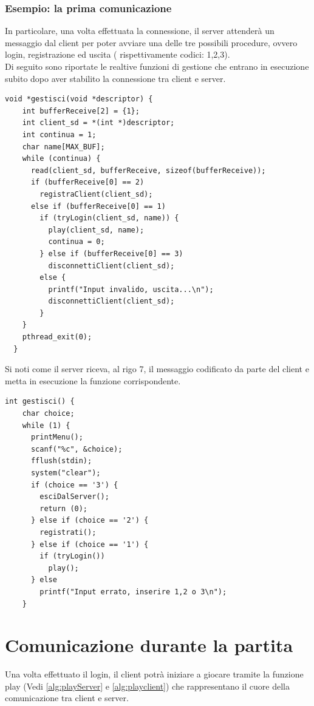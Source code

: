 \documentclass[a4paper]{article}
\begin{document}
 \subsubsection{Esempio: la prima comunicazione}
 In particolare, una volta effettuata la connessione,
il server attenderà un messaggio dal client per poter avviare una delle tre possibili procedure, ovvero login, registrazione ed uscita ( rispettivamente codici: 1,2,3).\\
Di seguito sono riportate le realtive funzioni di gestione che entrano in esecuzione subito dopo aver stabilito la connessione
tra client e server.
\begin{lstlisting}[caption=Prima comunicazione del server, label=alg:serverPreLogin]
  void *gestisci(void *descriptor) {
    int bufferReceive[2] = {1};
    int client_sd = *(int *)descriptor;
    int continua = 1;
    char name[MAX_BUF];
    while (continua) {
      read(client_sd, bufferReceive, sizeof(bufferReceive));
      if (bufferReceive[0] == 2)
        registraClient(client_sd);
      else if (bufferReceive[0] == 1)
        if (tryLogin(client_sd, name)) {
          play(client_sd, name);
          continua = 0;
        } else if (bufferReceive[0] == 3)
          disconnettiClient(client_sd);
        else {
          printf("Input invalido, uscita...\n");
          disconnettiClient(client_sd);
        }
    }
    pthread_exit(0);
  }
\end{lstlisting}
Si noti come il server riceva, al rigo 7, il messaggio codificato da parte del client e metta in esecuzione la funzione corrispondente.
\begin{lstlisting}[caption=Prima comunicazione del client, label=alg:clientPreLogin]
  int gestisci() {
    char choice;
    while (1) {
      printMenu();
      scanf("%c", &choice);
      fflush(stdin);
      system("clear");
      if (choice == '3') {
        esciDalServer();
        return (0);
      } else if (choice == '2') {
        registrati();
      } else if (choice == '1') {
        if (tryLogin())
          play();
      } else
        printf("Input errato, inserire 1,2 o 3\n");
    }
  \end{lstlisting}
\section{Comunicazione durante la partita}
Una volta effettuato il login, il client potrà iniziare a giocare tramite la funzione play (Vedi \autoref{alg:playServer} e \autoref{alg:playclient})
che rappresentano il cuore della comunicazione tra client e server.\\
\end{document}
